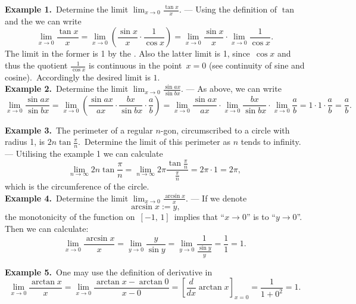 \documentclass[12pt]{article}
\theoremstyle{definition}
\begin{document}
\textbf{Example 1.}\, Determine the limit $\displaystyle\lim_{x\to 0}\frac{\tan{x}}{x}$.\; --- Using the definition of $\tan$ and the  we can write
$$\displaystyle\lim_{x\to 0}\frac{\tan{x}}{x} = 
\lim_{x\to0}\left(\frac{\sin{x}}{x}\cdot\frac{1}{\cos{x}}\right) = 
\lim_{x\to0}\frac{\sin{x}}{x}\cdot\lim_{x\to0}\frac{1}{\cos{x}}.$$
The limit in the former  is 1 by the .  Also the latter limit is 1, since\, $\cos{x}$ and thus the quotient $\displaystyle\frac{1}{\cos{x}}$ is continuous in the point \,$x = 0$ (see continuity of sine and cosine).\, Accordingly the desired limit is $1$.\\

\textbf{Example 2.}\, Determine the limit $\displaystyle\lim_{x\to 0}\frac{\sin{ax}}{\sin{bx}}$.\; --- As above, we can write
$$\displaystyle\lim_{x\to 0}\frac{\sin{ax}}{\sin{bx}} = 
\lim_{x\to0}\left(\frac{\sin{ax}}{ax}\cdot\frac{bx}{\sin{bx}}\cdot\frac{a}{b}\right) = 
\lim_{x\to0}\frac{\sin{ax}}{ax}\cdot\lim_{x\to0}\frac{bx}{\sin{bx}}\cdot\lim_{x\to0}\frac{a}{b} 
= 1\cdot1\cdot\frac{a}{b} = \frac{a}{b}.$$

\textbf{Example 3.}\, The perimeter of a regular $n$-gon, circumscribed to a circle with radius 1, is $2n\tan\frac{\pi}{n}$.\, Determine the limit of this perimeter as $n$ tends to infinity.\, --- Utilising the example 1 we can calculate
$$\lim_{n\to\infty}2n\tan\frac{\pi}{n} = \lim_{n\to\infty}2\pi\frac{\tan\frac{\pi}{n}}{\frac{\pi}{n}} = 2\pi\cdot1 = 2\pi,$$
which is the circumference of the circle.\\

\textbf{Example 4.}\, Determine the limit $\displaystyle\lim_{x\to 0}\frac{\arcsin{x}}{x}$.\; --- If we denote\,      $$\arcsin{x} := y,$$
the monotonicity of the  function on\, $[-1,\,1]$\, implies that ``$x\to0$'' is  to ``$y\to0$''.\, Then we can calculate:
$$\lim_{x\to 0}\frac{\arcsin{x}}{x} = \lim_{y\to0}\frac{y}{\sin{y}} = \lim_{y\to0}\frac{1}{\frac{\sin{y}}{y}} = \frac{1}{1} = 1.$$

\textbf{Example 5.}\, One may use the definition of derivative in
$$\lim_{x\to0}\frac{\arctan{x}}{x} = \lim_{x\to0}\frac{\arctan{x}-\arctan{0}}{x-0} = \left[\frac{d}{dx}\arctan{x}\right]_{x=0} = \frac{1}{1+0^2} = 1.$$






\end{document}
